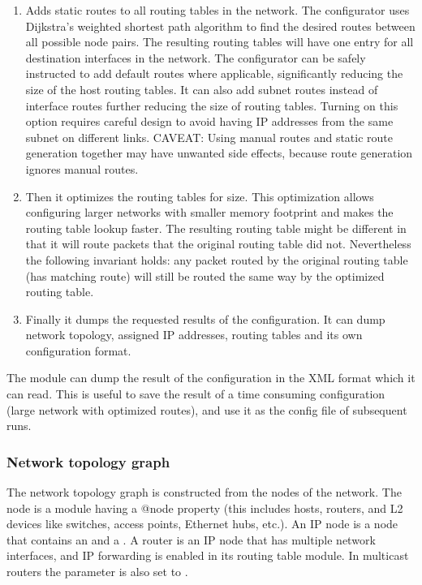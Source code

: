 \begin{enumerate}
  \item  Adds static routes to all routing tables in the network. The
     configurator uses Dijkstra's weighted shortest path algorithm to find
     the desired routes between all possible node pairs. The resulting
     routing tables will have one entry for all destination interfaces in the
     network. The configurator can be safely instructed to add default routes
     where applicable, significantly reducing the size of the host routing
     tables. It can also add subnet routes instead of interface routes further
     reducing the size of routing tables. Turning on this option requires
     careful design to avoid having IP addresses from the same subnet on
     different links. CAVEAT: Using manual routes and static route generation
     together may have unwanted side effects, because route generation ignores
     manual routes.

  \item  Then it optimizes the routing tables for size. This optimization allows
     configuring larger networks with smaller memory footprint and makes the
     routing table lookup faster. The resulting routing table might be
     different in that it will route packets that the original routing table
     did not. Nevertheless the following invariant holds: any packet routed
     by the original routing table (has matching route) will still be routed
     the same way by the optimized routing table.

  \item  Finally it dumps the requested results of the configuration. It can
     dump network topology, assigned IP addresses, routing tables and its
     own configuration format.
\end{enumerate}

The module can dump the result of the configuration in the XML format
which it can read. This is useful to save the result of a time consuming
configuration (large network with optimized routes), and use it as
the config file of subsequent runs.

\subsubsection*{Network topology graph}

The network topology graph is constructed from the nodes
of the network. The node is a module having a @node property
(this includes hosts, routers, and L2 devices like switches,
 access points, Ethernet hubs, etc.). An IP node is a node
that contains an  and a .
A router is an IP node that has multiple network interfaces,
and IP forwarding is enabled in its routing table module.
In multicast routers the  parameter
is also set to .

